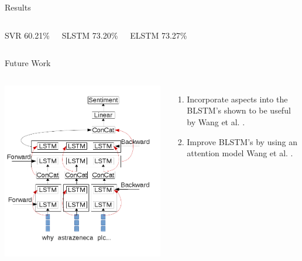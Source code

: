 \documentclass[10pt]{beamer}
\begin{document}
\begin{frame}[fragile]{Results}

\begin{columns}[T,onlytextwidth]
\begin{block}{SVR}
60.21\%
\end{block}
\begin{block}{SLSTM}
73.20\%
\end{block}
\begin{block}{ELSTM}
73.27\%
\end{block}

\end{columns}


\end{frame}
\begin{frame}[fragile]{Future Work}
\begin{columns}[T,onlytextwidth]
\includegraphics[scale=0.3]{lstm_diagram.png}

\begin{enumerate}
\item Incorporate aspects into the BLSTM's shown to be useful by Wang et al. \cite{wangattention}.
\item Improve BLSTM's by using an attention model Wang et al. \cite{wangattention}.
\end{enumerate}
\end{columns}
\end{frame}
\end{document}
